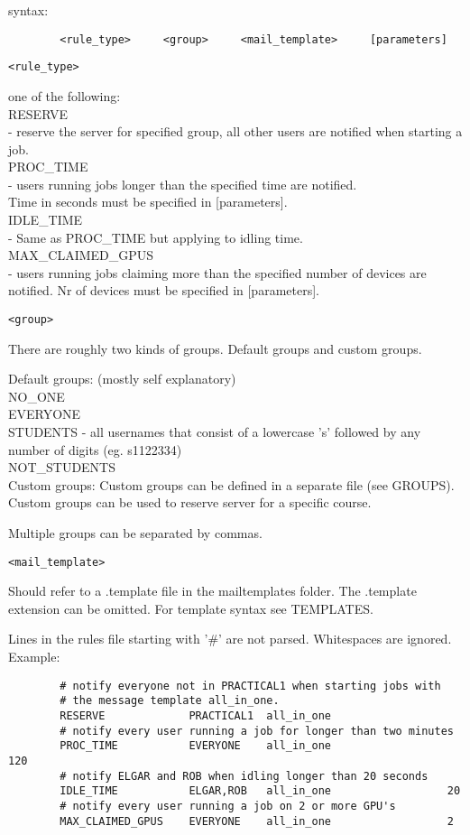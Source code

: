 \documentclass[10pt]{article}
\begin{document}
syntax:
\begin{verbatim}
        <rule_type>     <group>     <mail_template>     [parameters]
\end{verbatim}
\begin{verbatim}<rule_type>\end{verbatim}one of the following:\\
RESERVE\\
- reserve the server for specified group, all other users
are notified when starting a job.\\
PROC\_TIME\\
- users running jobs longer than the specified time are 
notified. \\Time in seconds must be specified in [parameters].\\
IDLE\_TIME\\
- Same as PROC\_TIME but applying to idling time.\\
MAX\_CLAIMED\_GPUS\\
- users running jobs claiming more than the specified number 
of devices are notified. Nr of devices must be specified 
in [parameters].

\begin{verbatim}<group>\end{verbatim}
There are roughly two kinds of groups. Default groups and 
custom groups. 

Default groups: (mostly self explanatory)\\
NO\_ONE\\
EVERYONE\\
STUDENTS
- all usernames that consist of a lowercase 's' followed 
by any number of digits (eg. s1122334)\\
NOT\_STUDENTS\\

Custom groups:
Custom groups can be defined in a separate file (see GROUPS). Custom 
groups can be used to reserve server for a specific course.

Multiple groups can be separated by commas.


\begin{verbatim}<mail_template>\end{verbatim}
Should refer to a .template file in the mailtemplates folder.
The .template extension can be omitted. For template syntax
see TEMPLATES.


Lines in the rules file starting with '\#' are not parsed.
Whitespaces are ignored.
Example:
\begin{verbatim}
        # notify everyone not in PRACTICAL1 when starting jobs with 
        # the message template all_in_one.
        RESERVE             PRACTICAL1  all_in_one
        # notify every user running a job for longer than two minutes
        PROC_TIME           EVERYONE    all_in_one                  120
        # notify ELGAR and ROB when idling longer than 20 seconds
        IDLE_TIME           ELGAR,ROB   all_in_one                  20
        # notify every user running a job on 2 or more GPU's
        MAX_CLAIMED_GPUS    EVERYONE    all_in_one                  2
\end{verbatim}
        
\end{document}
